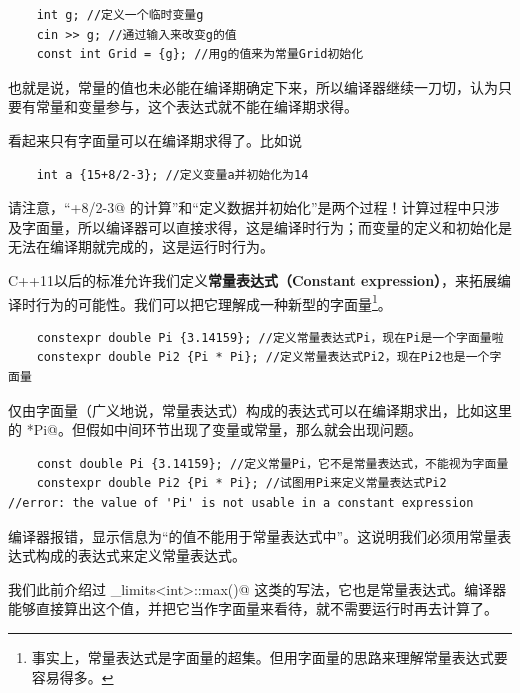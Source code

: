 \begin{lstlisting}
    int g; //定义一个临时变量g
    cin >> g; //通过输入来改变g的值
    const int Grid = {g}; //用g的值来为常量Grid初始化
\end{lstlisting}
也就是说，常量的值也未必能在编译期确定下来，所以编译器继续一刀切，认为只要有常量和变量参与，这个表达式就不能在编译期求得。\par
看起来只有字面量可以在编译期求得了。比如说
\begin{lstlisting}
    int a {15+8/2-3}; //定义变量a并初始化为14
\end{lstlisting}
请注意，``+8/2-3@ 的计算''和``定义数据并初始化''是两个过程！计算过程中只涉及字面量，所以编译器可以直接求得，这是编译时行为；而变量的定义和初始化是无法在编译期就完成的，这是运行时行为。\par
C++11以后的标准允许我们定义\textbf{常量表达式（Constant expression）}，来拓展编译时行为的可能性。我们可以把它理解成一种新型的字面量\footnote{事实上，常量表达式是字面量的超集。但用字面量的思路来理解常量表达式要容易得多。}。
\begin{lstlisting}
    constexpr double Pi {3.14159}; //定义常量表达式Pi，现在Pi是一个字面量啦
    constexpr double Pi2 {Pi * Pi}; //定义常量表达式Pi2，现在Pi2也是一个字面量
\end{lstlisting}
仅由字面量（广义地说，常量表达式）构成的表达式可以在编译期求出，比如这里的 \lstinline@Pi*Pi@。但假如中间环节出现了变量或常量，那么就会出现问题。
\begin{lstlisting}
    const double Pi {3.14159}; //定义常量Pi，它不是常量表达式，不能视为字面量
    constexpr double Pi2 {Pi * Pi}; //试图用Pi来定义常量表达式Pi2
//error: the value of 'Pi' is not usable in a constant expression
\end{lstlisting}
编译器报错，显示信息为``\lstinline@Pi@ 的值不能用于常量表达式中''。这说明我们必须用常量表达式构成的表达式来定义常量表达式。\par
我们此前介绍过 \lstinline@numeric_limits<int>::max()@ 这类的写法，它也是常量表达式。编译器能够直接算出这个值，并把它当作字面量来看待，就不需要运行时再去计算了。\par
